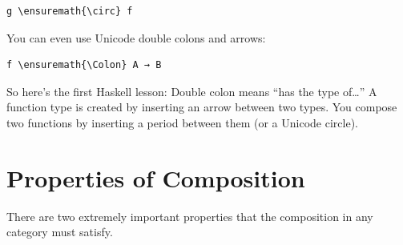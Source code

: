 \begin{Verbatim}[commandchars=\\\{\}]
g \ensuremath{\circ} f
\end{Verbatim}
You can even use Unicode double colons and arrows:

\begin{Verbatim}[commandchars=\\\{\}]
f \ensuremath{\Colon} A → B
\end{Verbatim}
So here's the first Haskell lesson: Double colon means ``has the type
of\ldots{}'' A function type is created by inserting an arrow between
two types. You compose two functions by inserting a period between them
(or a Unicode circle).

\section{Properties of Composition}\label{properties-of-composition}

There are two extremely important properties that the composition in any
category must satisfy.

